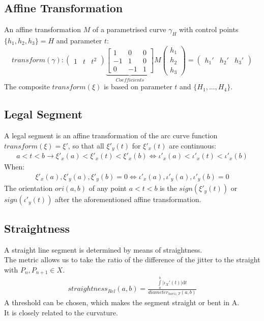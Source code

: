 \documentclass{report}
\begin{document}
\subsection{Affine Transformation}
An affine transformation $M$ of a parametrised curve $\gamma_{H}$ with control points $\{h_{1},h_{2},h_{3}\} = H$ and parameter $t$:
\begin{equation}
transform(\gamma):
\begin{pmatrix}
1 & t & t^2
\end{pmatrix}
\underbrace{\begin{bmatrix}
1 & 0 & 0\\
-1 & 1 & 0\\
0 & -1 &1
\end{bmatrix}}_{Coefficients}
M
\begin{pmatrix}
h_{1} \\
h_{2} \\
h_{3}
\end{pmatrix}
=
\begin{pmatrix}
h_{1}' & h_{2}' & h_{3}'
\end{pmatrix}
\end{equation}
The composite $transform(\xi)$ is based on parameter $t$ and $\{H_{1}, ... ,H_{4}\}$. ~\cite[Spline\_Axioms.tex]{Stopeight}

\subsection{Legal Segment}
A legal segment is an affine transformation of the arc curve function $transform(\xi) = \xi'$, so that all $\xi'_{y}(t)$ for $\xi'_{x}(t)$ are continuous:
\begin{align}
a<t<b\rightarrow \xi'_{x}(a)<\xi'_{x}(t)<\xi'_{x}(b) \Leftrightarrow \iota'_{x}(a)<\iota'_{x}(t)<\iota'_{x}(b)
\end{align}
When:
\begin{align}
\xi'_{x}(a),\xi'_{y}(a), \xi'_{y}(b) = 0 \Leftrightarrow \iota'_{x}(a),\iota'_{y}(a), \iota'_{y}(b) = 0
\end{align}
The orientation $ori(a,b)$ of any point $a < t < b$ is the $sign(\xi'_{y}(t))$ or $sign(\iota'_{y}(t))$ after the aforementioned affine transformation.

\subsection{Straightness}
A straight line segment is determined by means of straightness.\\
The metric allows us to take the ratio of the difference of the jitter to the straight with $P_{n},P_{n+1} \in X$. \\
\begin{align}
straightness_{Rel}(a,b)=\frac{\int \limits _{a}^{b} \lvert \iota_{X}'(t) \rvert \mathrm{d}t}{diameter_{horiz,T}(a,b)}
\end{align}
A threshold can be chosen, which makes the segment straight or bent in A.\\
It is closely related to the curvature.
\end{document}
